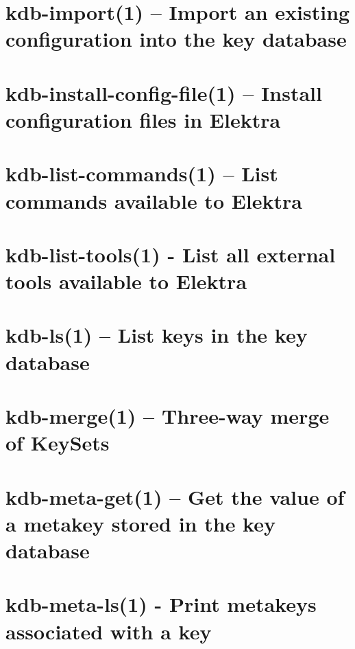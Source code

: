 \let\mypdfximage\pdfximage\def\pdfximage{\immediate\mypdfximage}\documentclass[twoside]{book}
\newcommand{\+}{\discretionary{\mbox{\scriptsize$\hookleftarrow$}}{}{}}
\begin{document}
\chapter{kdb-\/import(1) -- Import an existing configuration into the key database}
\label{doc_help_kdb-import_md}

\chapter{kdb-\/install-\/config-\/file(1) -- Install configuration files in Elektra}
\label{doc_help_kdb-install-config-file_md}

\chapter{kdb-\/list-\/commands(1) -- List commands available to Elektra}
\label{doc_help_kdb-list-commands_md}

\chapter{kdb-\/list-\/tools(1) -\/ List all external tools available to Elektra}
\label{doc_help_kdb-list-tools_md}

\chapter{kdb-\/ls(1) -- List keys in the key database}
\label{doc_help_kdb-ls_md}

\chapter{kdb-\/merge(1) -- Three-\/way merge of Key\+Sets}
\label{doc_help_kdb-merge_md}

\chapter{kdb-\/meta-\/get(1) -- Get the value of a metakey stored in the key database}
\label{doc_help_kdb-meta-get_md}

\chapter{kdb-\/meta-\/ls(1) -\/ Print metakeys associated with a key}
\label{doc_help_kdb-meta-ls_md}

\end{document}

